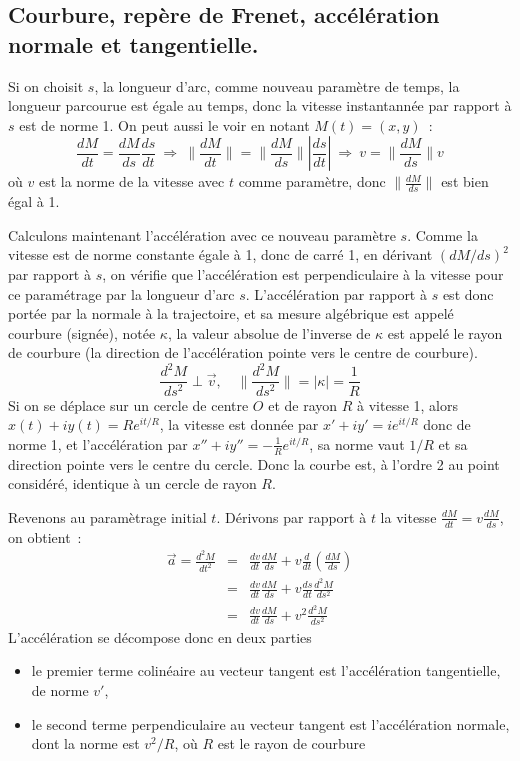 \documentclass[a4paper,11pt]{article}
\begin{document}
\begin{giacjshere}
\subsection{Courbure, rep\`ere de Frenet, accélération normale et
  tangentielle.} \label{sec:courbure}
Si on choisit $s$, la longueur d'arc, comme nouveau paramètre de temps, 
la longueur parcourue est égale au temps, donc la vitesse instantannée
par rapport \`a $s$ est de norme 1. On peut aussi le voir en notant $M(t)=(x,y)$~:
$$ \frac{dM}{dt} =\frac{dM}{ds} \frac{ds}{dt} 
\ \Rightarrow \ \| \frac{dM}{dt} \| = \| \frac{dM}{ds} \| |\frac{ds}{dt}|
\ \Rightarrow \ v = \| \frac{dM}{ds} \| v$$
o\`u $v$ est la norme de la vitesse avec $t$ comme param\`etre,
donc $\| \frac{dM}{ds} \|$ est bien \'egal \`a 1.

Calculons maintenant l'accélération avec ce nouveau paramètre $s$. Comme
la vitesse est de norme constante égale à 1, donc de carré 1, 
en dérivant $(dM/ds)^2$ par rapport \`a $s$,
on v\'erifie que l'accélération est perpendiculaire à la vitesse
pour ce paramétrage par la longueur d'arc $s$. 
L'acc\'el\'eration par rapport \`a $s$ est donc portée par la normale à la trajectoire,
et sa mesure alg\'ebrique est appelé courbure (sign\'ee), not\'ee $\kappa$,
la valeur absolue de l'inverse de $\kappa$ est appel\'e le rayon de courbure
(la direction de l'accélération pointe vers le centre
de courbure). 
$$ \frac{d^2M}{ds^2} \perp \vec{v}, \quad \| \frac{d^2M}{ds^2}\| =
|\kappa| = \frac{1}{R} $$
Si on se déplace sur un cercle de centre $O$
et de rayon $R$ à vitesse 1, alors $x(t)+iy(t)=Re^{it/R}$, la vitesse
est donnée par $x'+iy'=ie^{it/R}$ donc de norme 1, et l'accélération
par $x''+iy''=-\frac1R e^{it/R}$, sa norme vaut $1/R$ et sa direction
pointe vers le centre du cercle. Donc la courbe est, 
à l'ordre 2 au point considéré, identique à un cercle de rayon $R$.

Revenons au paramètrage initial $t$. Dérivons par rapport à $t$ la vitesse
$\frac{dM}{dt} = v \frac{dM}{ds}$, on obtient~:
\begin{eqnarray*}
 \vec{a} =\frac{d^2M}{dt^2} 
&=&\frac{dv}{dt} \frac{dM}{ds} + v \frac{d}{dt} \left( \frac{dM}{ds} \right)\\
&=&\frac{dv}{dt} \frac{dM}{ds} + v \frac{ds}{dt} \frac{d^2M}{ds^2}\\
&=& \frac{dv}{dt} \frac{dM}{ds} + v^2 \frac{d^2M}{ds^2}
\end{eqnarray*}
L'accélération se décompose donc en deux parties~
\begin{itemize}
\item  le premier
terme colinéaire au vecteur tangent est l'accélération 
tangentielle, 
de norme $v'$, 
\item le second terme perpendiculaire au vecteur tangent
est l'accélération normale, 
dont la norme est $v^2/R$,
où $R$ est le rayon de courbure
\end{itemize}


\end{giacjshere}
\end{document}
